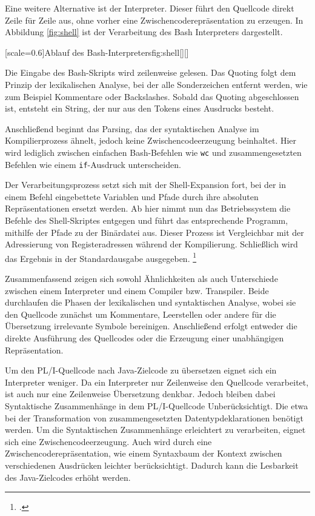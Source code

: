 Eine weitere Alternative ist der Interpreter. Dieser führt den Quellcode direkt Zeile für Zeile aus, ohne vorher eine Zwischencoderepräsentation zu erzeugen. In Abbildung \ref{fig:shell} ist der Verarbeitung des Bash Interpreters dargestellt.


[scale=0.6]{Ablauf des Bash-Interpreters}{fig:shell}[][]
\pagebreak

Die Eingabe des Bash-Skripts wird zeilenweise gelesen.
Das Quoting folgt dem Prinzip der lexikalischen Analyse, bei der alle Sonderzeichen entfernt werden, wie zum Beispiel Kommentare oder Backslashes. Sobald das Quoting abgeschlossen ist, entsteht ein String, der nur aus den Tokens eines Ausdrucks besteht.

Anschließend beginnt das Parsing, das der syntaktischen Analyse im Kompilierprozess ähnelt, jedoch keine Zwischencodeerzeugung beinhaltet. Hier wird lediglich zwischen einfachen Bash-Befehlen wie \verb+wc+ und zusammengesetzten Befehlen wie einem \verb+if+-Ausdruck unterscheiden.

Der Verarbeitungsprozess setzt sich mit der Shell-Expansion fort, bei der in einem Befehl eingebettete Variablen und Pfade durch ihre absoluten Repräsentationen ersetzt werden.
Ab hier nimmt nun das Betriebssystem die Befehle des Shell-Skriptes entgegen und führt das entsprechende Programm, mithilfe der Pfade zu der Binärdatei aus. Dieser Prozess ist Vergleichbar mit der Adressierung von Registeradressen während der Kompilierung.
Schließlich wird das Ergebnis in der Standardausgabe ausgegeben. \footcite[Vgl. ][]{gnubash}


Zusammenfassend zeigen sich sowohl Ähnlichkeiten als auch Unterschiede zwischen einem Interpreter und einem Compiler bzw. Transpiler. Beide durchlaufen die Phasen der lexikalischen und syntaktischen Analyse, wobei sie den Quellcode zunächst um Kommentare, Leerstellen oder andere für die Übersetzung irrelevante Symbole bereinigen. Anschließend erfolgt entweder die direkte Ausführung des Quellcodes oder die Erzeugung einer unabhängigen Repräsentation.

Um den PL/I-Quellcode nach Java-Zielcode zu übersetzen eignet sich ein Interpreter weniger. Da ein Interpreter nur Zeilenweise den Quellcode verarbeitet, ist auch nur eine Zeilenweise Übersetzung denkbar. Jedoch bleiben dabei Syntaktische Zusammenhänge in dem PL/I-Quellcode Unberücksichtigt. Die etwa bei der Transformation von zusammengesetzten Datentypdeklarationen benötigt werden. Um die Syntaktischen Zusammenhänge erleichtert zu verarbeiten, eignet sich eine Zwischencodeerzeugung.
Auch wird durch eine Zwischencoderepräsentation, wie einem Syntaxbaum der Kontext zwischen verschiedenen Ausdrücken leichter berücksichtigt. Dadurch kann die Lesbarkeit des Java-Zielcodes erhöht werden.


